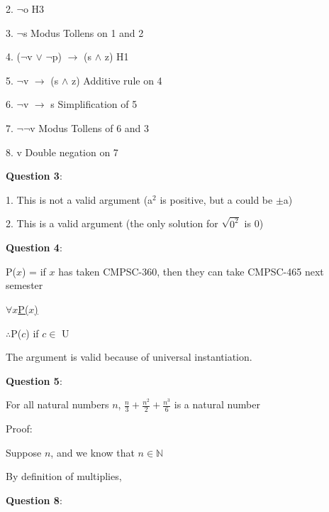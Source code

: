 \documentclass{article} %
\newcommand{\question}[2][]{\begin{flushleft}
        \textbf{Question #1}: \textit{#2}

\end{flushleft}}
\begin{document}
    2. $\neg$o \tabto*{5cm}H3

    3. $\neg$s \tabto*{5cm}Modus Tollens on 1 and 2

    4. ($\neg$v $\lor$ $\neg$p) $\rightarrow$ (s $\land$ z) \tabto*{5cm}H1
    
    5. $\neg$v $\rightarrow$ (s $\land$ z) \tabto*{5cm}Additive rule on 4

    6. $\neg$v $\rightarrow$ s \tabto*{5cm}Simplification of 5

    7. $\neg \neg$v \tabto*{5cm}Modus Tollens of 6 and 3

    8. v \tabto*{5cm}Double negation on 7

    \question[3]{}

    1. This is not a valid argument (a$^2$ is positive, but a could be $\pm$a)
    
    2. This is a valid argument (the only solution for $\sqrt{0^2}$ is 0)

    \question[4]{}

    P($x$) = if $x$ has taken CMPSC-360, then they can take CMPSC-465 next semester

    \hspace*{0cm}

    \underline{$\forall x$P($x$) \phantom{aaaaaa}}

    $\therefore$P($c$) if $c \in $ U

    \hspace*{0cm}

    The argument is valid because of universal instantiation.

    \question[5]{}

    For all natural numbers $n$, $\frac{n}{3} + \frac{n^2}{2} + \frac{n^3}{6}$ is a natural number

    \hspace*{0cm}

    Proof:

    Suppose $n$, and we know that $n \in \mathbb{N}$

    By definition of multiplies, 

    \question[8]{}

    
    
\end{document}
